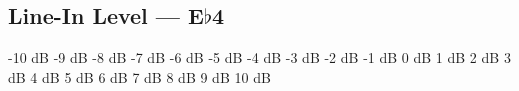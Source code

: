 \subsection[Line-In Level]{Line-In Level --- \UiKey{\SET}E$\flat$4}































-10 dB 
-9 dB
-8 dB
-7 dB
-6 dB
-5 dB
-4 dB
-3 dB
-2 dB
-1 dB
0 dB
1 dB
2 dB
3 dB
4 dB
5 dB
6 dB
7 dB
8 dB
9 dB
10 dB
